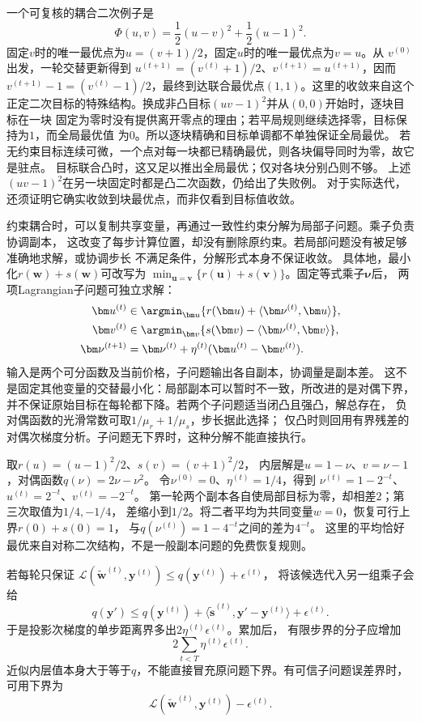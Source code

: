 一个可复核的耦合二次例子是
\[
  \Phi(u,v)=\frac12(u-v)^2+\frac12(u-1)^2.
\]
固定$v$时的唯一最优点为$u=(v+1)/2$，固定$u$时的唯一最优点为$v=u$。从
$v^{(0)}$出发，一轮交替更新得到
$u^{(t+1)}=(v^{(t)}+1)/2$、$v^{(t+1)}=u^{(t+1)}$，因而
$v^{(t+1)}-1=(v^{(t)}-1)/2$，最终到达联合最优点$(1,1)$。这里的收敛来自这个
正定二次目标的特殊结构。换成非凸目标$(uv-1)^2$并从$(0,0)$开始时，逐块目标在一块
固定为零时没有提供离开零点的理由；若平局规则继续选择零，目标保持为$1$，而全局最优值
为$0$。所以逐块精确和目标单调都不单独保证全局最优。
若无约束目标连续可微，一个点对每一块都已精确最优，则各块偏导同时为零，故它是驻点。
目标联合凸时，这又足以推出全局最优；仅对各块分别凸则不够。
上述$(uv-1)^2$在另一块固定时都是凸二次函数，仍给出了失败例。
对于实际迭代，还须证明它确实收敛到块最优点，而非仅看到目标值收敛。

约束耦合时，可以复制共享变量，再通过一致性约束分解为局部子问题。乘子负责协调副本，
这改变了每步计算位置，却没有删除原约束。若局部问题没有被足够准确地求解，或协调步长
不满足条件，分解形式本身不保证收敛。
具体地，最小化$r(\bm w)+s(\bm w)$可改写为
$\min_{\bm u=\bm v}\{r(\bm u)+s(\bm v)\}$。固定等式乘子$\bm\nu$后，
两项Lagrangian子问题可独立求解：
\begin{align}
 \bm u^{(t)}&\in\argmin_{\bm u}\{r(\bm u)+\langle\bm\nu^{(t)},\bm u\rangle\},\nonumber\\
 \bm v^{(t)}&\in\argmin_{\bm v}\{s(\bm v)-\langle\bm\nu^{(t)},\bm v\rangle\},\nonumber\\
 \bm\nu^{(t+1)}&=\bm\nu^{(t)}+\eta^{(t)}(\bm u^{(t)}-\bm v^{(t)}).
 \label{eq:opt-consensus-dual-decomposition}
\end{align}
输入是两个可分函数及当前价格，子问题输出各自副本，协调量是副本差。
这不是固定其他变量的交替最小化：局部副本可以暂时不一致，所改进的是对偶下界，
并不保证原始目标在每轮都下降。若两个子问题适当闭凸且强凸，解总存在，
负对偶函数的光滑常数可取$1/\mu_r+1/\mu_s$，步长据此选择；
仅凸时则回用有界残差的对偶次梯度分析。子问题无下界时，这种分解不能直接执行。

取$r(u)=(u-1)^2/2$、$s(v)=(v+1)^2/2$，
内层解是$u=1-\nu$、$v=\nu-1$，对偶函数$q(\nu)=2\nu-\nu^2$。
令$\nu^{(0)}=0$、$\eta^{(t)}=1/4$，得到
$\nu^{(t)}=1-2^{-t}$、$u^{(t)}=2^{-t}$、$v^{(t)}=-2^{-t}$。
第一轮两个副本各自使局部目标为零，却相差$2$；第三次取值为$1/4,-1/4$，
差缩小到$1/2$。将二者平均为共同变量$w=0$，恢复可行上界$r(0)+s(0)=1$，
与$q(\nu^{(t)})=1-4^{-t}$之间的差为$4^{-t}$。
这里的平均恰好最优来自对称二次结构，不是一般副本问题的免费恢复规则。

若每轮只保证
$\mathcal L(\widetilde{\bm w}^{(t)},\bm y^{(t)})\leq q(\bm y^{(t)})+\epsilon^{(t)}$，
将该候选代入另一组乘子会给
\[
 q(\bm y')\leq q(\bm y^{(t)})
 +\langle\widetilde{\bm s}^{(t)},\bm y'-\bm y^{(t)}\rangle+\epsilon^{(t)}.
\]
于是投影次梯度的单步距离界多出$2\eta^{(t)}\epsilon^{(t)}$。累加后，
有限步界的分子应增加
\[
 2\sum_{t<T}\eta^{(t)}\epsilon^{(t)}.
\]
近似内层值本身大于等于$q$，不能直接冒充原问题下界。有可信子问题误差界时，
可用下界为
\[
 \mathcal L(\widetilde{\bm w}^{(t)},\bm y^{(t)})-\epsilon^{(t)}.
\]

